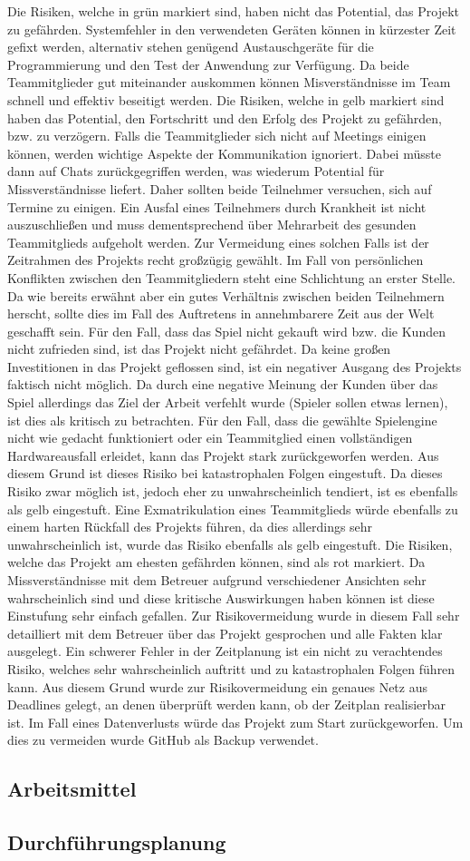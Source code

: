 Die Risiken, welche in grün markiert sind, haben nicht das Potential, das Projekt zu gefährden. Systemfehler in den verwendeten Geräten können in kürzester Zeit gefixt werden, alternativ stehen genügend Austauschgeräte für die Programmierung und den Test der Anwendung zur Verfügung. Da beide Teammitglieder gut miteinander auskommen können Misverständnisse im Team schnell und effektiv beseitigt werden.
Die Risiken, welche in gelb markiert sind haben das Potential, den Fortschritt und den Erfolg des Projekt zu gefährden, bzw. zu verzögern. Falls die Teammitglieder sich nicht auf Meetings einigen können, werden wichtige Aspekte der Kommunikation ignoriert. Dabei müsste dann auf Chats zurückgegriffen werden, was wiederum Potential für Missverständnisse liefert. Daher sollten beide Teilnehmer versuchen, sich auf Termine zu einigen.
Ein Ausfal eines Teilnehmers durch Krankheit ist nicht auszuschließen und muss dementsprechend über Mehrarbeit des gesunden Teammitglieds aufgeholt werden. Zur Vermeidung eines solchen Falls ist der Zeitrahmen des Projekts recht großzügig gewählt. Im Fall von persönlichen Konflikten zwischen den Teammitgliedern steht eine Schlichtung an erster Stelle. Da wie bereits erwähnt aber ein gutes Verhältnis zwischen beiden Teilnehmern herscht, sollte dies im Fall des Auftretens in annehmbarere Zeit aus der Welt geschafft sein. Für den Fall, dass das Spiel nicht gekauft wird bzw. die Kunden nicht zufrieden sind, ist das Projekt nicht gefährdet. Da keine großen Investitionen in das Projekt geflossen sind, ist ein negativer Ausgang des Projekts faktisch nicht möglich. Da durch eine negative Meinung der Kunden über das Spiel allerdings das Ziel der Arbeit verfehlt wurde (Spieler sollen etwas lernen), ist dies als kritisch zu betrachten.
Für den Fall, dass die gewählte Spielengine nicht wie gedacht funktioniert oder ein Teammitglied einen vollständigen Hardwareausfall erleidet, kann das Projekt stark zurückgeworfen werden. Aus diesem Grund ist dieses Risiko bei katastrophalen Folgen eingestuft. Da dieses Risiko zwar möglich ist, jedoch eher zu unwahrscheinlich tendiert, ist es ebenfalls als gelb eingestuft.
Eine Exmatrikulation eines Teammitglieds würde ebenfalls zu einem harten Rückfall des Projekts führen, da dies allerdings sehr unwahrscheinlich ist, wurde das Risiko ebenfalls als gelb eingestuft.
Die Risiken, welche das Projekt am ehesten gefährden können, sind als rot markiert. Da Missverständnisse mit dem Betreuer aufgrund verschiedener Ansichten sehr wahrscheinlich sind und diese kritische Auswirkungen haben können ist diese Einstufung sehr einfach gefallen. Zur Risikovermeidung wurde in diesem Fall sehr detailliert mit dem Betreuer über das Projekt gesprochen und alle Fakten klar ausgelegt.
Ein schwerer Fehler in der Zeitplanung ist ein nicht zu verachtendes Risiko, welches sehr wahrscheinlich auftritt und zu katastrophalen Folgen führen kann. Aus diesem Grund wurde zur Risikovermeidung ein genaues Netz aus Deadlines gelegt, an denen überprüft werden kann, ob der Zeitplan realisierbar ist. Im Fall eines Datenverlusts würde das Projekt zum Start zurückgeworfen. Um dies zu vermeiden wurde GitHub als Backup verwendet.

\subsection{Arbeitsmittel}

\subsection{Durchführungsplanung}